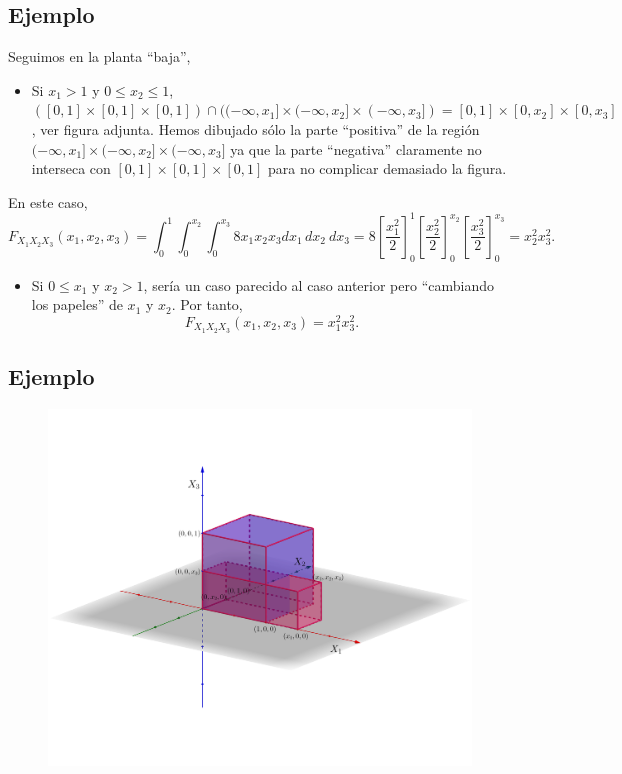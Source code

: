 \documentclass[]{book}
\providecommand{\tightlist}{%
  \setlength{\itemsep}{0pt}\setlength{\parskip}{0pt}}
\begin{document}
\hypertarget{ejemplo-103}{%
\subsection{Ejemplo}\label{ejemplo-103}}

Seguimos en la planta ``baja'',

\begin{itemize}
\tightlist
\item
  Si \(x_1 >1\) y \(0\leq x_2\leq 1\), \(([0,1]\times [0,1]\times [0,1])\cap ((-\infty,x_1]\times (-\infty,x_2]\times (-\infty,x_3])=[0,1]\times [0,x_2]\times [0,x_3]\), ver figura adjunta. Hemos dibujado sólo la parte ``positiva'' de la región \((-\infty,x_1]\times (-\infty,x_2]\times (-\infty,x_3]\) ya que la parte ``negativa'' claramente no interseca con \([0,1]\times [0,1]\times [0,1]\) para no complicar demasiado la figura.
\end{itemize}

En este caso,
\[
F_{X_1X_2X_3}(x_1,x_2,x_3)=\int_{0}^{1}\int_{0}^{x_2}\int_{0}^{x_3} 8 x_1 x_2 x_3 dx_1\, dx_2\ dx_3 = 
8\left[\frac{x_1^2}{2}\right]_0^{1}\left[\frac{x_2^2}{2}\right]_0^{x_2}\left[\frac{x_3^2}{2}\right]_0^{x_3} = x_2^2 x_3^2.
\]

\begin{itemize}
\tightlist
\item
  Si \(0\leq x_1\) y \(x_2>1\), sería un caso parecido al caso anterior pero ``cambiando los papeles'' de \(x_1\) y \(x_2\).
  Por tanto,
  \[
  F_{X_1X_2X_3}(x_1,x_2,x_3)=x_1^2 x_3^2.
  \]
\end{itemize}

\hypertarget{ejemplo-104}{%
\subsection{Ejemplo}\label{ejemplo-104}}

\begin{figure}
\includegraphics[width=800px]{Images/Fx1x2x3bajosx1} \end{figure}
\end{document}
